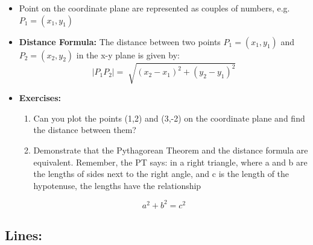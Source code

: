 \documentclass[11pt]{article}
\theoremstyle{definition}
\theoremstyle{remark}
\begin{document}
\begin{itemize}
\item Point on the coordinate plane are represented as couples of numbers, e.g. $P_1 = (x_1, y_1)$
\item \textbf{Distance Formula:} The distance between two points $P_1 = (x_1, y_1)$ and $P_2 = (x_2, y_2) $ in the x-y plane is given by:
\begin{equation*}
|P_1P_2| = \sqrt[]{(x_2-x_1)^2+(y_2-y_1)^2}
\end{equation*}
\item \textbf{Exercises:}
\begin{enumerate}
\item Can you plot the points (1,2) and (3,-2) on the coordinate plane and find the distance between them?
\item Demonstrate that the Pythagorean Theorem and the distance formula are equivalent. Remember, the PT says:  in a right triangle, where a and b are the lengths of sides next to the right angle, and c is the length of the hypotenuse, the lengths have the relationship
\end{enumerate}
\begin{equation*}
a^2 + b^2 = c^2
\end{equation*}
\end{itemize}

\subsection{Lines:}
\end{document}

